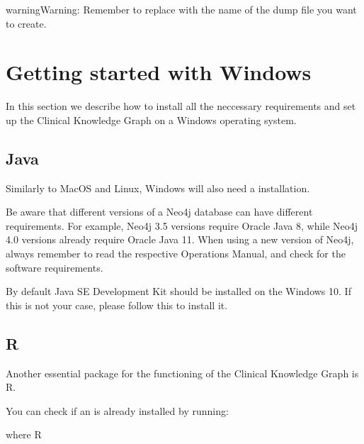 \documentclass[letterpaper,10pt,english]{sphinxmanual}
\begin{document}
\begin{sphinxadmonition}{warning}{Warning:}
Remember to replace  with the name of the dump file you want to create.
\end{sphinxadmonition}


\section{Getting started with Windows}
\label{\detokenize{intro/getting-started-with-windows:getting-started-with-windows}}\label{\detokenize{intro/getting-started-with-windows:windows-installation}}\label{\detokenize{intro/getting-started-with-windows::doc}}
In this section we describe how to install all the neccessary requirements and set up the Clinical Knowledge Graph on a Windows operating system.


\subsection{Java}
\label{\detokenize{intro/getting-started-with-windows:java}}
Similarly to MacOS and Linux, Windows will also need a  installation.

Be aware that different versions of a Neo4j database can have different requirements. For example, Neo4j 3.5 versions require Oracle Java 8, while Neo4j 4.0 versions already require Oracle Java 11.
When using a new version of Neo4j, always remember to read the respective Operations Manual, and check for the software requirements.

By default Java SE Development Kit should be installed on the Windows 10. If this is not your case, please follow this  to install it.


\subsection{R}
\label{\detokenize{intro/getting-started-with-windows:r}}
Another essential package for the functioning of the Clinical Knowledge Graph is R.

You can check if an  is already installed by running:

\begin{sphinxVerbatim}[commandchars=\\\{\}]
\PYGZgt{} where R
\end{sphinxVerbatim}
\end{document}
